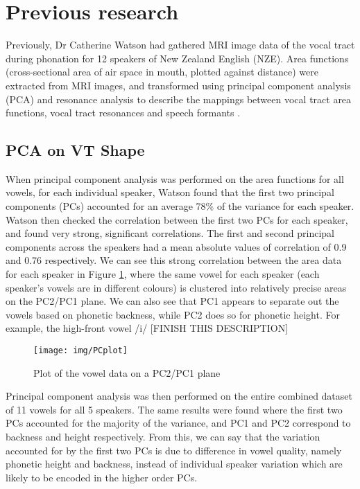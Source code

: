 \section{Previous research}

Previously, Dr Catherine Watson had gathered MRI image data of the vocal tract during phonation for 12 speakers of New Zealand English (NZE). Area functions (cross-sectional area of air space in mouth, plotted against distance) were extracted from MRI images, and transformed using principal component analysis (PCA) and resonance analysis to describe the mappings between vocal tract area functions, vocal tract resonances and speech formants \cite{watson2014mappings}.

\subsection{PCA on VT Shape}

When principal component analysis was performed on the area functions for all vowels, for each individual speaker, Watson found that the first two principal components (PCs) accounted for an average 78\% of the variance for each speaker. Watson then checked the correlation between the first two PCs for each speaker, and found very strong, significant correlations. 
The first and second principal components across the speakers had a mean absolute values of correlation of 0.9 and 0.76 respectively. We can see this strong correlation between the area data for each speaker in Figure \ref{fig:pcplot}, where the same vowel for each speaker (each speaker's vowels are in different colours) is clustered into relatively precise areas on the PC2/PC1 plane. We can also see that PC1 appears to separate out the vowels based on phonetic backness, while PC2 does so for phonetic height. For example, the high-front vowel /i/ [FINISH THIS DESCRIPTION]

\begin{figure}[H]
\centering
\texttt{[image: img/PCplot]}
\caption{Plot of the vowel data on a PC2/PC1 plane}
\label{fig:pcplot}
\end{figure}

Principal component analysis was then performed on the entire combined dataset of 11 vowels for all 5 speakers. The same results were found where the first two PCs accounted for the majority of the variance, and PC1 and PC2 correspond to backness and height respectively. From this, we can say that the variation accounted for by the first two PCs is due to difference in vowel quality, namely phonetic height and backness, instead of individual speaker variation which are likely to be encoded in the higher order PCs.


